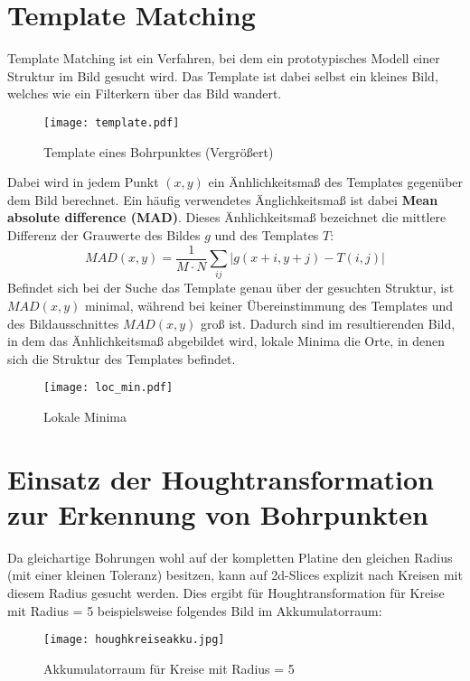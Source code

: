 \section{Template Matching}
	Template Matching ist ein Verfahren, bei dem ein prototypisches Modell einer Struktur im Bild gesucht wird. Das Template ist dabei selbst ein kleines Bild, welches wie ein Filterkern über das Bild wandert.
\begin{figure}[H]
  \begin{center}
    \texttt{[image: template.pdf]}
    \caption{Template eines Bohrpunktes (Vergrößert)}
    \label{fig:template}
  \end{center}
\end{figure}
Dabei wird in jedem Punkt $(x, y)$ ein Änhlichkeitsmaß des Templates gegenüber dem Bild berechnet.
Ein häufig verwendetes Änglichkeitsmaß ist dabei \textbf{Mean absolute difference (MAD)}.
Dieses Änhlichkeitsmaß bezeichnet die mittlere Differenz der Grauwerte des Bildes $g$ und des Templates $T$:
\begin{equation*}
MAD(x, y) = \frac{1}{M \cdot N} \sum_{ij}^{{}} \left | g(x +i, y + j) - T(i, j) \right |
\end{equation*}
Befindet sich bei der Suche das Template genau über der gesuchten Struktur, ist $MAD(x, y)$ minimal, während bei keiner Übereinstimmung des Templates und des Bildausschnittes $MAD(x, y)$ groß ist. Dadurch sind im resultierenden Bild, in dem das Änhlichkeitsmaß abgebildet wird, lokale Minima die Orte, in denen sich die Struktur des Templates befindet.
\begin{figure}[H]
  \begin{center}
    \texttt{[image: loc\_min.pdf]}
    \caption{Lokale Minima}
    \label{fig:localminima}
  \end{center}
\end{figure}

\section{Einsatz der Houghtransformation zur Erkennung von Bohrpunkten}
Da gleichartige Bohrungen wohl auf der kompletten Platine den gleichen Radius (mit einer kleinen Toleranz) besitzen, kann auf 2d-Slices explizit nach Kreisen mit diesem Radius gesucht werden. Dies ergibt für Houghtransformation für Kreise mit Radius = 5 beispielsweise folgendes Bild im Akkumulatorraum:

\begin{figure}[H]
  \begin{center}
    \texttt{[image: houghkreiseakku.jpg]}
    \caption{Akkumulatorraum für Kreise mit Radius = 5}
    \label{fig:houghkreiseakku}
  \end{center}
\end{figure}

